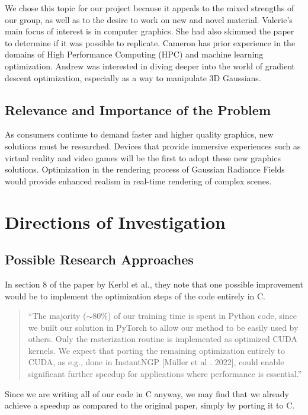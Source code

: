 \documentclass[12pt, a4paper, twocolumn]{article}
\begin{document}
We chose this topic for our project because it appeals to the 
mixed strengths of our group, as well as to the desire to work on new and novel material.
Valerie's main focus of interest is in computer graphics. She had also skimmed the paper to determine if it was possible to replicate.
Cameron has prior experience in the domains of High Performance Computing (HPC) and machine learning optimization.
Andrew was interested in diving deeper into the world of gradient descent optimization, especially
as a way to manipulate 3D Gaussians. 

\subsection{Relevance and Importance of the Problem}

As consumers continue to demand faster and higher quality graphics, new solutions must be researched. Devices that provide immersive experiences such as virtual reality and video games will be the first to adopt these new graphics solutions. Optimization in the rendering process of Gaussian Radiance Fields would provide enhanced realism in real-time rendering of complex scenes.

\section{Directions of Investigation}
\subsection{Possible Research Approaches}
In section 8 of the paper by Kerbl et al., \cite{kerbl20233d} they note that one possible 
improvement would be to implement the optimization steps of the
code entirely in C.
\begin{quote}
  ``The majority ($\sim$80\%) of our training time is spent in Python code,
  since we built our solution in PyTorch to allow our method to be
  easily used by others. Only the rasterization routine is implemented
  as optimized CUDA kernels. We expect that porting the remaining
  optimization entirely to CUDA, as e.g., done in InstantNGP [Müller
  et al . 2022], could enable significant further speedup for applications
  where performance is essential.''
\end{quote}

Since we are writing all of our code in C anyway, we may find that we already achieve a speedup
as compared to the original paper, simply by porting it to C.
\end{document}
